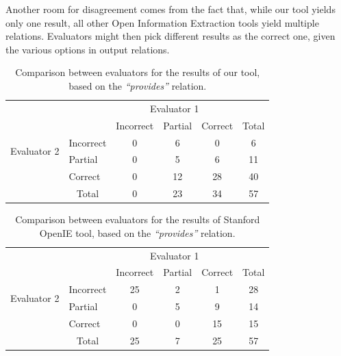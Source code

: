 \documentclass[11pt,a4paper,openright]{memoir}
\begin{document}
Another room for disagreement comes from the fact that, while our tool yields only one result, all other Open Information Extraction tools yield multiple relations. Evaluators might then pick different results as the correct one, given the various options in output relations.

\begin{table}[!htbp]
  \centering
\begin{tabular}{l|l|c|c|c|c}
\multicolumn{2}{c}{}&\multicolumn{3}{c}{Evaluator 1}&\\
\cline{3-5}
\multicolumn{2}{c|}{}&Incorrect&Partial&Correct&\multicolumn{1}{c}{Total}\\
\cline{2-5}
\multirow{2}{*}{Evaluator 2}& Incorrect & 0 & 6 & 0 & 6 \\
\cline{2-5}
& Partial & 0 & 5 & 6 & 11 \\
\cline{2-5}
& Correct & 0 & 12 & 28 & 40 \\
\cline{2-5}
\multicolumn{1}{c}{} & \multicolumn{1}{c}{Total} & \multicolumn{1}{c}{0} & \multicolumn{1}{c}{23} & \multicolumn{1}{c}{34} & 57 \\
\end{tabular}

  \caption[Comparison between evaluators for the results of our tool.]{Comparison between evaluators for the results of our tool, based on the \emph{\enquote{provides}} relation.}
  \label{tab:comparison_results_evaluators}
\end{table}


\begin{table}[!htbp]
  \centering
\begin{tabular}{l|l|c|c|c|c}
\multicolumn{2}{c}{}&\multicolumn{3}{c}{Evaluator 1}&\\
\cline{3-5}
\multicolumn{2}{c|}{}&Incorrect&Partial&Correct&\multicolumn{1}{c}{Total}\\
\cline{2-5}
\multirow{2}{*}{Evaluator 2}& Incorrect & 25 & 2 & 1 & 28 \\
\cline{2-5}
& Partial & 0 & 5 & 9 & 14 \\
\cline{2-5}
& Correct & 0 & 0 & 15 & 15 \\
\cline{2-5}
\multicolumn{1}{c}{} & \multicolumn{1}{c}{Total} & \multicolumn{1}{c}{25} & \multicolumn{1}{c}{7} & \multicolumn{1}{c}{25} & 57 \\
\end{tabular}

  \caption[Comparison between evaluators for the results of Stanford OpenIE tool.]{Comparison between evaluators for the results of Stanford OpenIE tool, based on the \emph{\enquote{provides}} relation.}
  \label{tab:comparison_results_evaluators_stanford}
\end{table}
\end{document}
